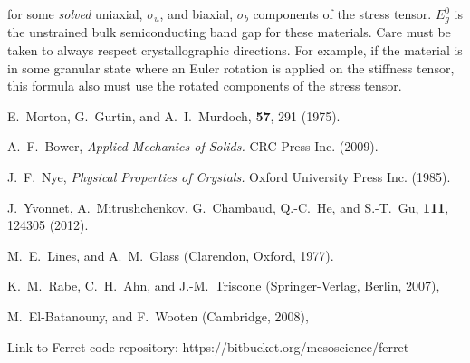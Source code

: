 \documentclass[16pt]{article} %
\begin{document}
for some \emph{solved} uniaxial, $\sigma_u$, and biaxial, $\sigma_b$ components of the stress tensor. $E_g^0$ is the unstrained bulk semiconducting band gap for these materials. Care must be taken to always respect crystallographic directions. For example, if the material is in some granular state where an Euler rotation is applied on the stiffness tensor, this formula also must use the rotated components of the stress tensor.

\begin{thebibliography}{1}

E.~Morton, G.~Gurtin, and A.~I.~Murdoch, 
 \textbf{57}, 291 (1975).

A.~F.~Bower,
\newblock \emph{Applied Mechanics of Solids.} CRC Press Inc. (2009).

J.~F.~Nye,
\newblock \emph{Physical Properties of Crystals.} Oxford University Press Inc. (1985).

J.~Yvonnet, A.~Mitrushchenkov, G.~Chambaud, Q.-C.~He, and S.-T.~Gu, 
 \textbf{111}, 124305 (2012).

M.~E.~Lines, and A.~M.~Glass 
 (Clarendon, Oxford, 1977).

K.~M.~Rabe, C.~H.~Ahn, and J.-M.~Triscone
 (Springer-Verlag, Berlin, 2007),

M.~El-Batanouny, and F.~Wooten
 (Cambridge, 2008),

Link to Ferret code-repository: https://bitbucket.org/mesoscience/ferret


\end{thebibliography}
\end{document}
